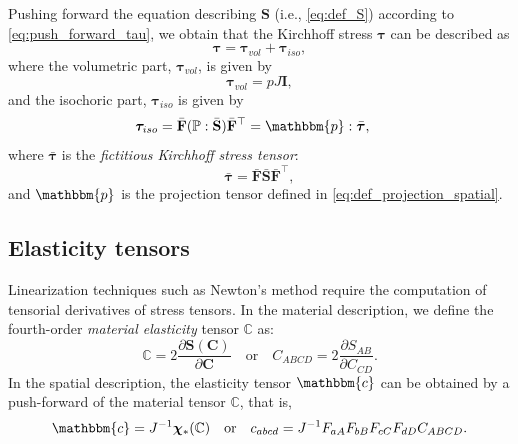 \documentclass{sfuthesis}
\numberwithin{equation}{section}
\numberwithin{figure}{chapter}
\numberwithin{table}{chapter}
\theoremstyle{definition}
\def\*#1{{\mathbf{#1}}} %
\newcommand{\pder}[2]{\dfrac{\partial #1}{\partial #2}}
\newcommand{\C}{\mathbb{C}}
\newcommand{\T}{\top}
\renewcommand{\c}{\mathbbm{c}}
\renewcommand{\P}{\mathbb{P}}
\newcommand{\p}{\mathbbm{p}}
\def\btau{{\bm{\tau}}}
\def\bchi{{\bm{\chi}}}
\begin{document}
Pushing forward the equation describing $\*S$ (i.e., \eqref{eq:def_S}) according to \eqref{eq:push_forward_tau}, we obtain that the Kirchhoff stress $\btau$ can be described as
\begin{equation} \label{eq:def_tau}
\btau = \btau_{vol} + \btau_{iso},
\end{equation}
where the volumetric part, $\btau_{vol}$, is given by
\begin{equation} \label{eq:def_tau_vol}
\btau_{vol} = pJ \*I,
\end{equation}
and the isochoric part, $\btau_{iso}$ is given by
\begin{equation} \label{eq:def_tau_iso}
\btau_{iso} = \bar{\*F} (\P : \bar{\*S}) \bar{\*F}^\T = \p : \bar{\btau}, \quad
\end{equation}
where $\bar{\btau}$ is the \textit{fictitious Kirchhoff stress tensor}:
\begin{equation} \label{eq:def_tau_bar}
    \bar{\btau} = \bar{\*F} \bar{\*S} \bar{\*F}^\T,
\end{equation} 
and $\p$ is the projection tensor defined in \eqref{eq:def_projection_spatial}.

\subsection*{Elasticity tensors}

Linearization techniques such as Newton's method require the computation of tensorial derivatives of stress tensors. In the material description, we define the fourth-order \textit{material elasticity} tensor $\C$ as:
\begin{equation}
\C = 2\pder{\*S(\*C)}{\*C} \quad \text{or} \quad C_{ABCD} = 2\pder{S_{AB}}{C_{CD}}.
\end{equation}
In the spatial description, the elasticity tensor $\c$ can be obtained by a push-forward of the material tensor $\C$, that is,
\begin{equation} \label{eq:def_c_spatial}
\c = J^{-1} \bchi_*(\C) \quad \text{or} \quad c_{abcd} = J^{-1} F_{aA} F_{bB} F_{cC} F_{dD} C_{ABCD}.
\end{equation}
\end{document}
